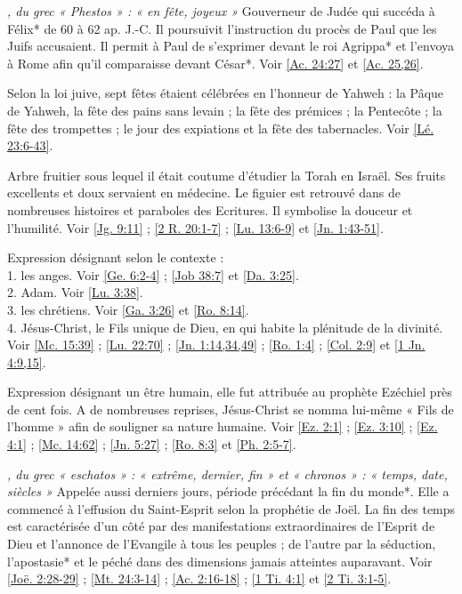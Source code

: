 \begin{multicols}{2}
\textit{, du grec « Phestos » : « en fête, joyeux »}\newline
Gouverneur de Judée qui succéda à Félix* de 60 à 62 ap. J.-C. Il poursuivit l'instruction du procès de Paul que les Juifs accusaient. Il permit à Paul de s'exprimer devant le roi Agrippa* et l'envoya à Rome afin qu'il comparaisse devant César*. Voir \vref{Ac. 24:27} et \vref{Ac. 25,26}.

\textit{}\newline
Selon la loi juive, sept fêtes étaient célébrées en l'honneur de Yahweh : la Pâque de Yahweh, la fête des pains sans levain ; la fête des prémices ; la Pentecôte ; la fête des trompettes ; le jour des expiations et la fête des tabernacles. Voir \vref{Lé. 23:6-43}.

\textit{}\newline
Arbre fruitier sous lequel il était coutume d'étudier la Torah en Israël. Ses fruits excellents et doux servaient en médecine. Le figuier est retrouvé dans de nombreuses histoires et paraboles des Ecritures. Il symbolise la douceur et l'humilité. Voir \vref{Jg. 9:11} ; \vref{2 R. 20:1-7} ; \vref{Lu. 13:6-9} et \vref{Jn. 1:43-51}.

\textit{}\newline
Expression désignant selon le contexte :
\\1. les anges. Voir \vref{Ge. 6:2-4} ; \vref{Job 38:7} et \vref{Da. 3:25}.
\\2. Adam. Voir \vref{Lu. 3:38}.
\\3. les chrétiens. Voir \vref{Ga. 3:26} et \vref{Ro. 8:14}.
\\4. Jésus-Christ, le Fils unique de Dieu, en qui habite la plénitude de la divinité. Voir \vref{Mc. 15:39} ; \vref{Lu. 22:70} ; \vref{Jn. 1:14,34,49} ; \vref{Ro. 1:4} ; \vref{Col. 2:9} et \vref{1 Jn. 4:9,15}.

\textit{}\newline
Expression désignant un être humain, elle fut attribuée au prophète Ezéchiel près de cent fois. A de nombreuses reprises, Jésus-Christ se nomma lui-même « Fils de l'homme » afin de souligner sa nature humaine. Voir \vref{Ez. 2:1} ; \vref{Ez. 3:10} ; \vref{Ez. 4:1} ; \vref{Mc. 14:62} ; \vref{Jn. 5:27} ; \vref{Ro. 8:3} et \vref{Ph. 2:5-7}.

\textit{, du grec « eschatos » : « extrême, dernier, fin » et « chronos » : « temps, date, siècles »}\newline
Appelée aussi derniers jours, période précédant la fin du monde*. Elle a commencé à l'effusion du Saint-Esprit selon la prophétie de Joël. La fin des temps est caractérisée d'un côté par des manifestations extraordinaires de l'Esprit de Dieu et l'annonce de l'Evangile à tous les peuples ; de l'autre par la séduction, l'apostasie* et le péché dans des dimensions jamais atteintes auparavant. Voir \vref{Joë. 2:28-29} ; \vref{Mt. 24:3-14} ; \vref{Ac. 2:16-18} ; \vref{1 Ti. 4:1} et \vref{2 Ti. 3:1-5}.


\end{multicols}

